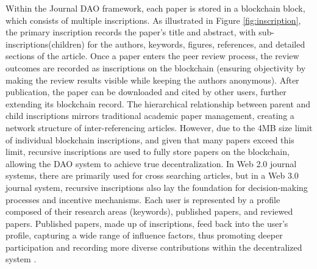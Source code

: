 \documentclass[lettersize,journal]{IEEEtran}
\begin{document}
Within the Journal DAO framework, each paper is stored in a blockchain block, which consists of multiple inscriptions. As illustrated in Figure \ref{fig:inscription}, the primary inscription records the paper's title and abstract, with sub-inscriptions(children) for the authors, keywords, figures, references, and detailed sections of the article. Once a paper enters the peer review process, the review outcomes are recorded as inscriptions on the blockchain (ensuring objectivity by making the review results visible while keeping the authors anonymous). After publication, the paper can be downloaded and cited by other users, further extending its blockchain record. The hierarchical relationship between parent and child inscriptions mirrors traditional academic paper management, creating a network structure of inter-referencing articles. However, due to the 4MB size limit of individual blockchain inscriptions, and given that many papers exceed this limit, recursive inscriptions are used to fully store papers on the blockchain, allowing the DAO system to achieve true decentralization. In Web 2.0 journal systems, there are primarily used for cross searching articles, but in a Web 3.0 journal system, recursive inscriptions also lay the foundation for decision-making processes and incentive mechanisms. Each user is represented by a profile composed of their research areas (keywords), published papers, and reviewed papers. Published papers, made up of inscriptions, feed back into the user's profile, capturing a wide range of influence factors, thus promoting deeper participation and recording more diverse contributions within the decentralized system \cite{BERTUCCI2024102338}.
\end{document}
